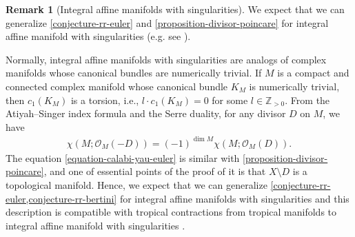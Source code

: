 \documentclass[a4paper,dvipdfmx,reqno,12pt]{amsart}
\theoremstyle{definition}
\newtheorem{remark}[theorem]{Remark}
\numberwithin{equation}{section}
\begin{document}
\begin{remark}[{Integral affine manifolds with singularities}]
\label{remark-iass}
We expect that we can generalize
\cref{conjecture-rr-euler} and 
\cref{proposition-divisor-poincare}
for integral affine manifold with singularities
(e.g. see \cite{MR2213573,MR2181810,MR4347312}).

Normally, integral affine manifolds with singularities
are analogs of complex manifolds whose canonical bundles
are numerically trivial. If $M$ is a compact and
connected complex manifold whose canonical bundle $K_M$ is
numerically trivial, then $c_1(K_M)$ is a torsion,
i.e., $l\cdot c_1(K_M)=0$ for 
some $l\in \mathbb{Z}_{>0}$.
From the Atiyah--Singer index formula and the Serre duality, 
for any divisor $D$ on $M$, we have
\begin{align}
\label{equation-calabi-yau-euler}
\chi(M;\mathcal{O}_M(-D))=(-1)^{\dim M}
\chi(M;\mathcal{O}_{M}(D)).
\end{align}
The equation \cref{equation-calabi-yau-euler} is
similar with
\cref{proposition-divisor-poincare}, and 
one of essential points of the proof of it
is that $X\setminus D$ is a topological manifold.
Hence, we expect that we can generalize
\cref{conjecture-rr-euler,conjecture-rr-bertini} for 
integral affine manifolds with singularities
and this description is compatible with
tropical contractions from tropical manifolds
to integral affine manifold with singularities
\cite{yamamoto2021tropical}.
\end{remark}
\end{document}
